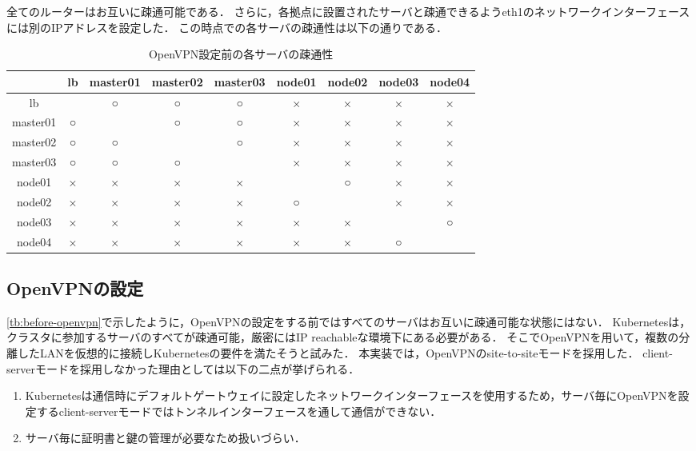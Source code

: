 全てのルーターはお互いに疎通可能である．
さらに，各拠点に設置されたサーバと疎通できるようeth1のネットワークインターフェースには別のIPアドレスを設定した．
この時点での各サーバの疎通性は以下の通りである．

\begin{table}[htb]
  \begin{center}
    \caption{OpenVPN設定前の各サーバの疎通性}
    \begin{tabular}{|c|c|c|c|c|c|c|c|c|} \hline
      & lb & master01 & master02 & master03 & node01 & node02 & node03 & node04 \\ \hline
      lb & \ & ○ & ○ & ○ & × & × & × & × \\ \hline
      master01 & ○ & \ & ○ & ○ & × & × & × & × \\ \hline
      master02 & ○ & ○ & \ & ○ & × & × & × & × \\ \hline
      master03 & ○ & ○ & ○ & \ & × & × & × & × \\ \hline
      node01 & × & × & × & × & \ & ○ & × & × \\ \hline
      node02 & × & × & × & × & ○ & \ & × & × \\ \hline
      node03 & × & × & × & × & × & × & \ & ○ \\ \hline
      node04 & × & × & × & × & × & × & ○ & \ \\ \hline
    \end{tabular}
  \end{center}
\end{table}
\label{tb:before-openvpn}

\subsection{OpenVPNの設定}

\ref{tb:before-openvpn}で示したように，OpenVPNの設定をする前ではすべてのサーバはお互いに疎通可能な状態にはない．
Kubernetesは，クラスタに参加するサーバのすべてが疎通可能，厳密にはIP reachableな環境下にある必要がある．
そこでOpenVPNを用いて，複数の分離したLANを仮想的に接続しKubernetesの要件を満たそうと試みた．
本実装では，OpenVPNのsite-to-siteモードを採用した．
client-serverモードを採用しなかった理由としては以下の二点が挙げられる．

\begin{enumerate}
  \item Kubernetesは通信時にデフォルトゲートウェイに設定したネットワークインターフェースを使用するため，サーバ毎にOpenVPNを設定するclient-serverモードではトンネルインターフェースを通して通信ができない．
  \item サーバ毎に証明書と鍵の管理が必要なため扱いづらい．
\end{enumerate}

